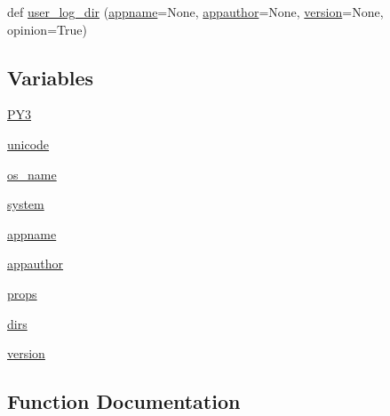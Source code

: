 \begin{DoxyCompactItemize}
\item 
def \hyperlink{namespacepip_1_1__vendor_1_1appdirs_a39d814e4debfc0bfd4dc911cb77a679e}{user\+\_\+log\+\_\+dir} (\hyperlink{namespacepip_1_1__vendor_1_1appdirs_ac05115f2b840ca0dd64e22b7fb956bfc}{appname}=None, \hyperlink{namespacepip_1_1__vendor_1_1appdirs_a6d123a471e72ef1998f585edc02e09a0}{appauthor}=None, \hyperlink{namespacepip_1_1__vendor_1_1appdirs_a87a875118dd18683cfabea51ad8ed700}{version}=None, opinion=True)
\end{DoxyCompactItemize}
\subsection*{Variables}
\begin{DoxyCompactItemize}
\item 
\hyperlink{namespacepip_1_1__vendor_1_1appdirs_a1a8b83b59fc16265183c0987b39ecdcf}{P\+Y3}
\item 
\hyperlink{namespacepip_1_1__vendor_1_1appdirs_a52f02ced77c74dadf09ee0c37c7f145b}{unicode}
\item 
\hyperlink{namespacepip_1_1__vendor_1_1appdirs_abd7e0653016f86470509c7b9936e3485}{os\+\_\+name}
\item 
\hyperlink{namespacepip_1_1__vendor_1_1appdirs_a246d6224efc5b1b26789f074156cca66}{system}
\item 
\hyperlink{namespacepip_1_1__vendor_1_1appdirs_ac05115f2b840ca0dd64e22b7fb956bfc}{appname}
\item 
\hyperlink{namespacepip_1_1__vendor_1_1appdirs_a6d123a471e72ef1998f585edc02e09a0}{appauthor}
\item 
\hyperlink{namespacepip_1_1__vendor_1_1appdirs_ac3d55b74a1942114b1ae406cdb9eb3ec}{props}
\item 
\hyperlink{namespacepip_1_1__vendor_1_1appdirs_abeba4aa357df351d5c2395ff9fff9661}{dirs}
\item 
\hyperlink{namespacepip_1_1__vendor_1_1appdirs_a87a875118dd18683cfabea51ad8ed700}{version}
\end{DoxyCompactItemize}


\subsection{Function Documentation}
\mbox{\label{namespacepip_1_1__vendor_1_1appdirs_ab09d66ec806f315bb8450d8188e19396}} 
